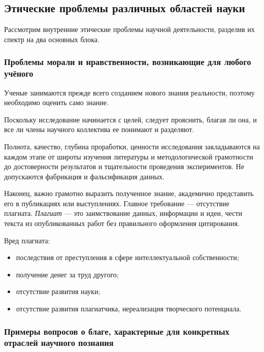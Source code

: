 \subsection{Этические проблемы различных областей науки}

Рассмотрим внутренние этические проблемы научной
деятельности, разделив их спектр на два основных блока. 

\subsubsection{Проблемы морали и нравственности,
возникающие для любого учёного}

Ученые занимаются прежде всего созданием нового знания
реальности, поэтому необходимо оценить само знание. 

Поскольку исследование начинается с целей, следует прояснить, благая ли она, и все ли члены научного коллектива ее понимают и разделяют.

Полнота, качество, глубина проработки, ценности исследования закладываются на каждом
этапе от широты изучения литературы и методологической грамотности до достоверности результатов и тщательности проведения экспериментов. Не допускаются фабрикация и фальсификация данных. 

Наконец, важно грамотно выразить полученное знание, академично представить его в публикациях или выступлениях. Главное требование --- отсутствие плагиата. \textit{Плагиат} --- это заимствование данных, информации и идеи, чести текста из опубликованных работ без правильного оформления цитирования.

Вред плагиата:
\begin{itemize}
    \item последствия от преступления в сфере интеллектуальной собственности;
    \item получение денег за труд другого;
    \item отсутствие развития науки;
    \item отсутствие развития плагиатчика, нереализация творческого потенциала.
\end{itemize}

\subsubsection{Примеры вопросов о благе,
характерные для конкретных отраслей научного познания}


